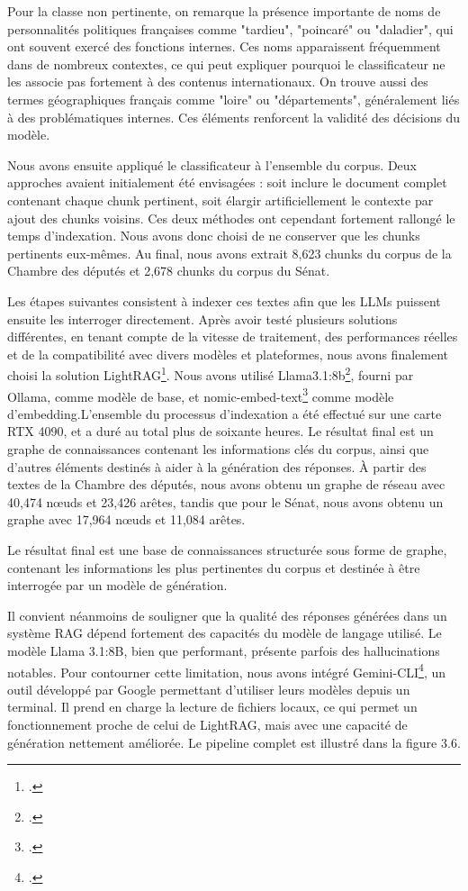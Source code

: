 \documentclass[a4paper,twoside,12pt]{book}
\begin{document}
Pour la classe non pertinente, on remarque la présence importante de noms de personnalités politiques françaises comme "tardieu", "poincaré" ou "daladier", qui ont souvent exercé des fonctions internes. Ces noms apparaissent fréquemment dans de nombreux contextes, ce qui peut expliquer pourquoi le classificateur ne les associe pas fortement à des contenus internationaux. On trouve aussi des termes géographiques français comme "loire" ou "départements", généralement liés à des problématiques internes. Ces éléments renforcent la validité des décisions du modèle.

Nous avons ensuite appliqué le classificateur à l'ensemble du corpus. Deux approches avaient initialement été envisagées : soit inclure le document complet contenant chaque chunk pertinent, soit élargir artificiellement le contexte par ajout des chunks voisins. Ces deux méthodes ont cependant fortement rallongé le temps d'indexation. Nous avons donc choisi de ne conserver que les chunks pertinents eux-mêmes. Au final, nous avons extrait 8,623 chunks du corpus de la Chambre des députés et 2,678 chunks du corpus du Sénat.

Les étapes suivantes consistent à indexer ces textes afin que les LLMs puissent ensuite les interroger directement. Après avoir testé plusieurs solutions différentes, en tenant compte de la vitesse de traitement, des performances réelles et de la compatibilité avec divers modèles et plateformes, nous avons finalement choisi la solution LightRAG\footcite{guo2024}. Nous avons utilisé Llama3.1:8b\footcite{zotero-754}, fourni par Ollama, comme modèle de base, et nomic-embed-text\footcite{zotero-756} comme modèle d'embedding.L'ensemble du processus d'indexation a été effectué sur une carte RTX 4090, et a duré au total plus de soixante heures. Le résultat final est un graphe de connaissances contenant les informations clés du corpus, ainsi que d'autres éléments destinés à aider à la génération des réponses. À partir des textes de la Chambre des députés, nous avons obtenu un graphe de réseau avec 40,474 nœuds et 23,426 arêtes, tandis que pour le Sénat, nous avons obtenu un graphe avec 17,964 nœuds et 11,084 arêtes.



Le résultat final est une base de connaissances structurée sous forme de graphe, contenant les informations les plus pertinentes du corpus et destinée à être interrogée par un modèle de génération.

Il convient néanmoins de souligner que la qualité des réponses générées dans un système RAG dépend fortement des capacités du modèle de langage utilisé. Le modèle Llama 3.1:8B, bien que performant, présente parfois des hallucinations notables. Pour contourner cette limitation, nous avons intégré Gemini-CLI\footcite{2025a}, un outil développé par Google permettant d'utiliser leurs modèles depuis un terminal. Il prend en charge la lecture de fichiers locaux, ce qui permet un fonctionnement proche de celui de LightRAG, mais avec une capacité de génération nettement améliorée. Le pipeline complet est illustré dans la figure 3.6.
\end{document}

